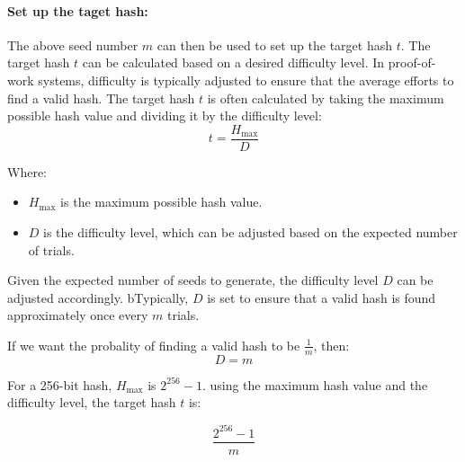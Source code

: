 \documentclass[runningheads]{llncs}
\begin{document}






\paragraph{Set up the taget hash:}
The above seed number $m$ can then be used to set up the target hash $t$. The target hash $t$ can be calculated based on a desired difficulty level. In proof-of-work systems, difficulty is typically adjusted to ensure that the average efforts to find a valid hash. The target hash $t$ is often calculated by taking the maximum possible hash value and dividing it by the difficulty level:
\[
t = \frac{H_{\text{max}}}{D}
\]

Where:
\begin{itemize}
  \item \( H_{\text{max}} \) is the maximum possible hash value.
  \item \( D \) is the difficulty level, which can be adjusted based on the expected number of trials.
\end{itemize}


Given the expected number of seeds to generate, 
the difficulty level $D$ can be adjusted accordingly.  bTypically, $D$ is set to ensure that a valid hash is found approximately once every $m$ trials.

If we want the probality of finding a valid hash to be $\frac{1}{m}$, then:
\[
D=m
\]

For a 256-bit hash, $H_{\text{max}}$ is $2^{256} - 1 $.  using the maximum hash value and the difficulty level, the target hash $t$ is:
    
\[
\frac{2^{256} - 1}{m}
\]
\end{document}
